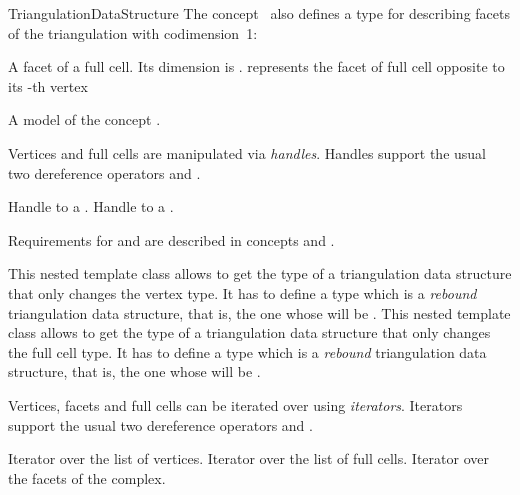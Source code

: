\begin{ccRefConcept}{TriangulationDataStructure}
The concept \ccRefName\ also defines a type for describing facets of the
triangulation with codimension~1:

{A facet of a full cell. Its dimension is
.  represents the facet of
full cell  opposite to its -th vertex}

{A model of the concept .}

Vertices and full cells are manipulated via \emph{handles}. Handles support the
usual two dereference operators  and .

{
Handle to a .
}
\ccGlue
{}
{
Handle to a .
}


Requirements for  and  are described in concepts
 and
 .

\begin{ccAdvanced}
{This nested template class allows to get the type of a triangulation
data structure that only changes the vertex type.  It has to define a type
 which is a {\it rebound} triangulation data structure, that is, the
one whose  will be .}
\ccGlue
{}
{This nested template class allows to get the type of a triangulation
data structure that only changes the full cell type.  It has to define a type
 which is a {\it rebound} triangulation data structure, that is, the
one whose  will be .}
\end{ccAdvanced}


Vertices, facets and full cells can be iterated over using \emph{iterators}.
Iterators support the usual two dereference operators  and
.

{
Iterator over the list of vertices.
}
\ccGlue
{}
{
Iterator over the list of full cells.
}
\ccGlue
{}
{
Iterator over the facets of the complex.
}

\ccGlue
{}


\end{ccRefConcept}
